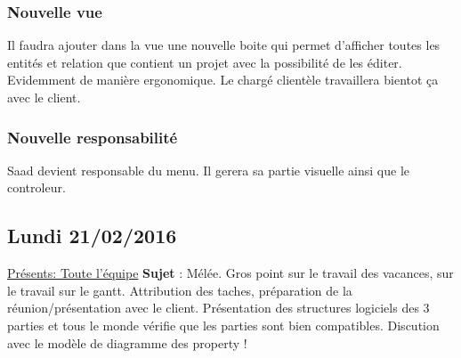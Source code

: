 \documentclass[a4paper,10pt]{article}
\begin{document}
\subsubsection*{Nouvelle vue}
Il faudra ajouter dans la vue une nouvelle boite qui permet d'afficher toutes les entités et relation que contient un projet avec la possibilité de les éditer.
Evidemment de manière ergonomique. Le chargé clientèle travaillera bientot ça avec le client.
\subsubsection*{Nouvelle responsabilité}
Saad devient responsable du menu. Il gerera sa partie visuelle ainsi que le controleur.

\subsection{Lundi 21/02/2016}
\underline{Présents: Toute l'équipe}  \newline
\textbf{Sujet} : Mélée. Gros point sur le travail des vacances, sur le travail sur le gantt.
\newline
Attribution des taches, préparation de la réunion/présentation avec le client. \newline
Présentation des structures logiciels des 3 parties et tous le monde vérifie que les parties sont bien compatibles. \newline
Discution avec le modèle de diagramme des property !
\end{document}
